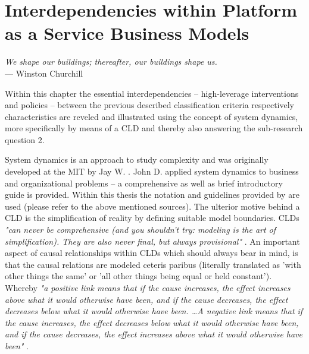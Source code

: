 \chapter[Interdependencies within Platform as a Service Business Models]{Interdependencies within Platform as a Service Business Models}\label{ch:cld}

\begin{flushright}{\slshape    
	We shape our buildings; thereafter, our buildings shape us.} \\ \medskip
	--- Winston Churchill
\end{flushright}

Within this chapter the essential interdependencies -- high-leverage interventions and policies -- between the previous described classification criteria respectively characteristics are reveled and illustrated using the concept of system dynamics, more specifically by means of a \acf{CLD} and thereby also answering the sub-research question 2. 

System dynamics is an approach to study complexity and was originally developed at the \ac{MIT} by Jay W. \citet{Forrester1961}. John D. \citeauthor{Sterman2000} applied system dynamics to business and organizational problems -- a comprehensive \citep{Sterman2000} as well as brief \citep{Sterman2001} introductory guide is provided. Within this thesis the notation and guidelines provided by \citeauthor{Sterman2000} are used (please refer to the above mentioned sources). The ulterior motive behind a \ac{CLD} is the simplification of reality by defining suitable model boundaries. \acp{CLD} \textit{"can never be comprehensive (and you shouldn't try: modeling is the art of simplification). They are also never final, but always provisional"} \citep[p. 166]{Sterman2000}. An important aspect of causal relationships within \acp{CLD} which should always bear in mind, is that the causal relations are modeled ceteris paribus (literally translated as 'with other things the same' or 'all other things being equal or held constant'). Whereby \textit{"a positive link means that if the cause increases, the effect increases above what it would otherwise have been, and if the cause decreases, the effect decreases below what it would otherwise have been. \ldots A negative link means that if the cause increases, the effect decreases below what it would otherwise have been, and if the cause decreases, the effect increases above what it would otherwise have been"} \citep[p. 139]{Sterman2000}.

